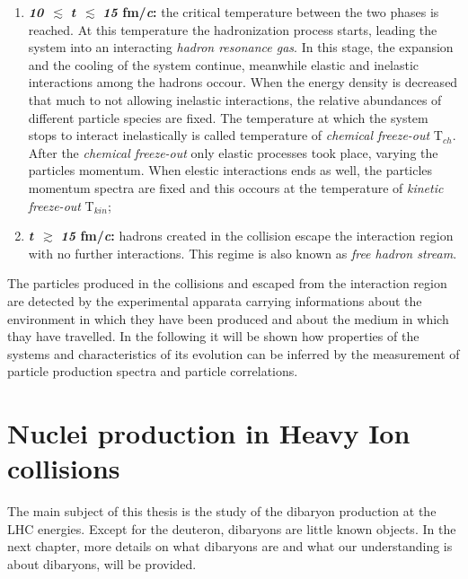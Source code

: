 \begin{enumerate}
    \item \textbf{\textit{10}} $\, \pmb{\lesssim}$ \textbf{\textit{t}} $\, \pmb{\lesssim}$ \textbf{\textit{15} fm/\textit{c}:}
            the critical temperature between the two phases is reached. At this temperature the hadronization process
            starts, leading the system into an interacting \textit{hadron resonance gas}. In this stage, the expansion
            and the cooling of the system continue, meanwhile elastic and inelastic interactions among the hadrons
            occour. 
            When the energy density is decreased that much to not allowing inelastic interactions, the relative 
            abundances of different particle species are fixed. The temperature at which the system stops to 
            interact inelastically is called temperature of \textit{chemical freeze-out} T$_{ch}$. After the
            \textit{chemical freeze-out} only elastic processes took place, varying the particles momentum.
            When elestic interactions ends as well, the particles momentum spectra are fixed and this occours
            at the temperature of \textit{kinetic freeze-out} T$_{kin}$;

    \item \textbf{\textit{t}} $\, \pmb{\gtrsim}$ \textbf{\textit{15} fm/\textit{c}:} hadrons created in 
            the collision escape the interaction region with no further interactions. This regime is 
            also known as \textit{free hadron stream}.
\end{enumerate}

The particles produced in the collisions and escaped from the interaction region are detected by 
the experimental apparata carrying informations about the environment in 
which they have been produced and about the medium in which thay have travelled. 
In the following it will be shown how properties of the systems and characteristics of its 
evolution can be inferred by the measurement of particle production spectra and particle correlations.

%
%
\section{Nuclei production in Heavy Ion collisions} \label{sec:1.4}

The main subject of this thesis is the study of the \dst dibaryon production at the LHC energies.
Except for the deuteron, dibaryons are little known objects. In the next chapter, more details
on what dibaryons are and what our understanding is about dibaryons, will be provided. 

